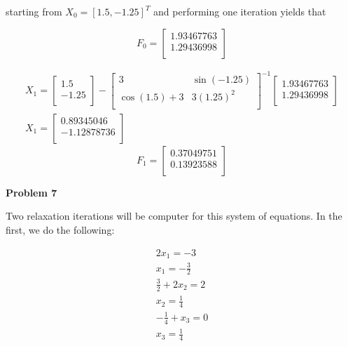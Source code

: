 \documentclass[a4paper,12pt]{article}
\begin{document}
starting from $X_0=[1.5,-1.25]^T$ and performing one iteration yields that 

\begin{equation*}
F_0=\begin{bmatrix} 1.93467763 \\[0.2em] 1.29436998 \\[0.2em] \end{bmatrix}
\end{equation*}

\begin{eqnarray*}
X_1=\begin{bmatrix} 1.5 \\[0.2em] -1.25 \\[0.2em] \end{bmatrix}-
 \begin{bmatrix}
	3 & \sin{(-1.25)}  \\[0.2em]
	\cos{(1.5)}+3 & 3(1.25)^2  \\[0.2em]
     \end{bmatrix}^{-1}
\begin{bmatrix} 1.93467763 \\[0.2em] 1.29436998 \\[0.2em] \end{bmatrix} \\
X_1= \begin{bmatrix} 0.89345046 \\[0.2em] -1.12878736 \\[0.2em] \end{bmatrix}
\end{eqnarray*}
\begin{equation*}
F_1=\begin{bmatrix} 0.37049751 \\[0.2em] 0.13923588 \\[0.2em] \end{bmatrix}
\end{equation*}

\vfil\eject

{\bf Problem 7}

Two relaxation iterations will be computer for this system of equations. In the first, we do the following:

\begin{eqnarray*}
2x_1=-3 \\
x_1=-\frac{3}{2} \\
\frac{3}{2}+2x_2=2 \\
x_2=\frac{1}{4} \\
-\frac{1}{4}+x_3=0 \\
x_3=\frac{1}{4}
\end{eqnarray*}
\end{document}
